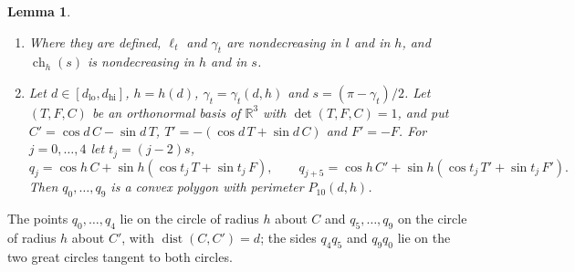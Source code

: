 \documentclass[12pt]{amsart}
\newtheorem{lemma}[theorem]{Lemma}
\theoremstyle{definition}
\theoremstyle{plain}
\theoremstyle{definition}
\newcommand{\R}{\mathbb{R}}
\newcommand{\dist}{\operatorname{dist}}
\newcommand{\dlo}{d_{\mathrm{lo}}}
\newcommand{\dhi}{d_{\mathrm{hi}}}
\newcommand{\leanmap}[1]{\ignorespaces}
\newcommand{\codemap}[1]{\ignorespaces}
\newcommand{\mapnote}[1]{\ignorespaces}
\begin{document}
\begin{lemma}\label{lem:perims}\leanmap{Tammes15.hexPoly, Tammes15.tanLen, Tammes15.tanAng, Tammes15.chordC, Tammes15.tanLen_monotoneOn_l, Tammes15.tanLen_monotoneOn_h, Tammes15.tanAng_monotoneOn_l, Tammes15.tanAng_monotoneOn_h, Tammes15.chordC_monotoneOn_h, Tammes15.chordC_monotoneOn_s, Tammes15.Geom.qpoly, Tammes15.Geom.Frame3, Tammes15.Geom.qpoly_isCPoly, Tammes15.Geom.qpoly_perim, Tammes15.onehex_chord_margin}\mapnote{item (1) for $l\in[0,\pi]$ in $\ell_t$ and $l\in[0,\pi)$ in $\gamma_t$, with $\arccos$ equal to $\pi$ below $-1$ and to $0$ above $1$}\codemap{code/lean/numerics/chord.gp > code/lean/numerics/chord.out}
\begin{enumerate}
\item Where they are defined, $\ell_t$ and $\gamma_t$ are nondecreasing in $l$ and in $h$, and $\operatorname{ch}_h(s)$ is nondecreasing in $h$ and in $s$.
\item Let $d\in[\dlo,\dhi]$, $h=h(d)$, $\gamma_t=\gamma_t(d,h)$ and $s=(\pi-\gamma_t)/2$. Let $(T,F,C)$ be an orthonormal basis of $\R^3$ with $\det(T,F,C)=1$, and put $C'=\cos d\,C-\sin d\,T$, $T'=-(\cos d\,T+\sin d\,C)$ and $F'=-F$. For $j=0,\dots,4$ let $t_j=(j-2)s$,
\[
q_j=\cos h\,C+\sin h(\cos t_j\,T+\sin t_j\,F),\qquad q_{j+5}=\cos h\,C'+\sin h(\cos t_j\,T'+\sin t_j\,F').
\]
Then $q_0,\dots,q_9$ is a convex polygon with perimeter $P_{10}(d,h)$.
\end{enumerate}
\end{lemma}

The points $q_0,\dots,q_4$ lie on the circle of radius $h$ about $C$ and $q_5,\dots,q_9$ on the circle of radius $h$ about $C'$, with $\dist(C,C')=d$; the sides $q_4q_5$ and $q_9q_0$ lie on the two great circles tangent to both circles.
\end{document}
